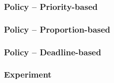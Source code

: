 \documentclass{beamer}
\begin{document}
\begin{frame}
  \frametitle{Policy -- Priority-based}
\end{frame}
\begin{frame}
  \frametitle{Policy -- Proportion-based}
\end{frame}
\begin{frame}
  \frametitle{Policy -- Deadline-based}
\end{frame}
\begin{frame}
  \frametitle{Experiment}
\end{frame}
\end{document}
